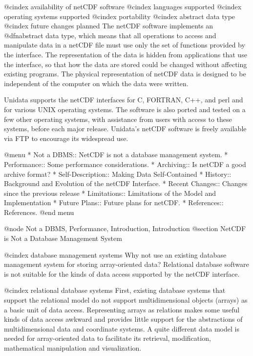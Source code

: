 @cindex availability of netCDF software
@cindex languages supported
@cindex operating systems supported
@cindex portability
@cindex abstract data type
@cindex future changes planned
The netCDF software implements an @dfn{abstract data type}, which means
that all operations to access and manipulate data in a netCDF file must
use only the set of functions provided by the interface.  The
representation of the data is hidden from applications that use the
interface, so that how the data are stored could be changed without
affecting existing programs.  The physical representation of netCDF data
is designed to be independent of the computer on which the data were
written.

Unidata supports the netCDF interfaces for C, FORTRAN, C++, and perl and
for various UNIX operating systems.  The software is also ported and
tested on a few other operating systems, with assistance from users with
access to these systems, before each major release.  Unidata's netCDF
software is freely available via FTP to encourage its widespread use.

@menu
* Not a DBMS::                  NetCDF is not a database management system.
* Performance::                 Some performance considerations.
* Archiving::                   Is netCDF a good archive format?
* Self-Description::            Making Data Self-Contained
* History::                     Background and Evolution of the netCDF Interface.
* Recent Changes::              Changes since the previous release
* Limitations::                 Limitations of the Model and Implementation
* Future Plans::                Future plans for netCDF.
* References::                  References.
@end menu

@node Not a DBMS, Performance, Introduction, Introduction
@section NetCDF is Not a Database Management System

@cindex database management systems
Why not use an existing database management system for storing
array-oriented data?  Relational database software is not suitable
for the kinds of
data access supported by the netCDF interface.

@cindex relational database systems
First, existing database systems that support the relational model do
not support multidimensional
objects (arrays) as a basic unit of data access.
Representing arrays as relations makes some useful kinds of data
access awkward and provides little support for the abstractions of
multidimensional data and coordinate systems.
A quite different data model is
needed for array-oriented data to facilitate its retrieval, modification,
mathematical manipulation and visualization.

